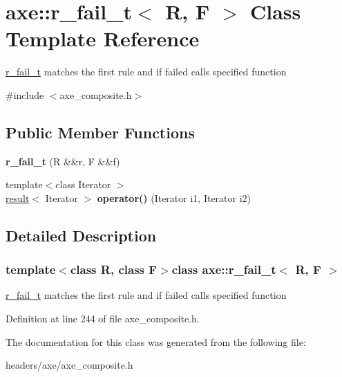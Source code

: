 \hypertarget{classaxe_1_1r__fail__t}{\section{axe\+:\+:r\+\_\+fail\+\_\+t$<$ R, F $>$ Class Template Reference}
\label{classaxe_1_1r__fail__t}
}


\hyperlink{classaxe_1_1r__fail__t}{r\+\_\+fail\+\_\+t} matches the first rule and if failed calls specified function  




{\ttfamily \#include $<$axe\+\_\+composite.\+h$>$}

\subsection*{Public Member Functions}
\begin{DoxyCompactItemize}
\item 
\hypertarget{classaxe_1_1r__fail__t_a1949ff1bcbd976d393cd1a57d23fcda0}{{\bfseries r\+\_\+fail\+\_\+t} (R \&\&r, F \&\&f)}\label{classaxe_1_1r__fail__t_a1949ff1bcbd976d393cd1a57d23fcda0}

\item 
\hypertarget{classaxe_1_1r__fail__t_aef1ad40e6c76aac059378827a3e66d8c}{{\footnotesize template$<$class Iterator $>$ }\\\hyperlink{structaxe_1_1result}{result}$<$ Iterator $>$ {\bfseries operator()} (Iterator i1, Iterator i2)}\label{classaxe_1_1r__fail__t_aef1ad40e6c76aac059378827a3e66d8c}

\end{DoxyCompactItemize}


\subsection{Detailed Description}
\subsubsection*{template$<$class R, class F$>$class axe\+::r\+\_\+fail\+\_\+t$<$ R, F $>$}

\hyperlink{classaxe_1_1r__fail__t}{r\+\_\+fail\+\_\+t} matches the first rule and if failed calls specified function 

Definition at line 244 of file axe\+\_\+composite.\+h.



The documentation for this class was generated from the following file\+:\begin{DoxyCompactItemize}
\item 
headers/axe/axe\+\_\+composite.\+h\end{DoxyCompactItemize}
